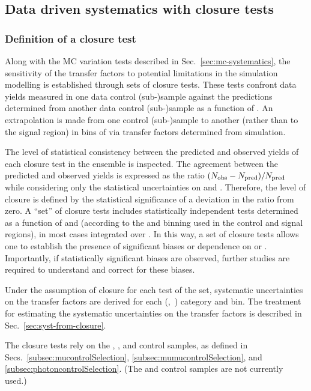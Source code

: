 \subsection{Data driven systematics with closure tests}
\label{sec:closure-tests}

\subsubsection{Definition of a closure test}
\label{sec:closure-tests-desc}

Along with the MC variation tests described in Sec.~\ref{sec:mc-systematics}, 
the sensitivity of the transfer factors to potential limitations in
the simulation modelling is established through sets of closure tests.
These tests confront data yields measured in one data control (sub-)sample
against the predictions determined from another data control
(sub-)sample as a function of \scalht. An extrapolation is made
from one control (sub-)sample to another (rather than to the signal
region) in bins of \scalht via transfer factors determined from
simulation. 

The level of statistical consistency between the predicted and
observed yields of each closure test in the ensemble is inspected. The
agreement between the predicted and observed yields is
expressed as the ratio $(\nobs - \npre)/\npre$ while considering only
the statistical uncertainties on \npre and \nobs. Therefore, the level
of closure is defined by the statistical significance of a deviation
in the ratio from zero. A ``set'' of closure tests includes
statistically independent tests determined as a function of \scalht
and \njet (according to the \scalht and \njet binning used in the control and signal
regions), in most cases integrated over \nb. In this way, a set of closure 
tests allows one to establish
the presence of significant biases or dependence on
\scalht or \njet. Importantly, if statistically significant biases are
observed, further studies are required to understand and correct for
these biases. 

Under the assumption of closure for each test of the set,
systematic uncertainties on the transfer factors are derived for each
(\njet,~\nb) category and \scalht bin. The treatment for estimating
the systematic uncertainties on the transfer factors is described in
Sec.~\ref{sec:syst-from-closure}.

The closure tests rely on the \mj, \mmj, and \gj control samples,
as defined in Secs.~\ref{subsec:mucontrolSelection},
\ref{subsec:mumucontrolSelection}, and
\ref{subsec:photoncontrolSelection}. (The \ej and \eej control samples
are not currently used.)

